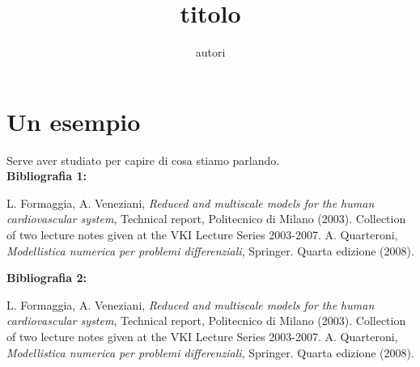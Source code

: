 \documentclass{article}
\title{titolo}
\author{autori}
\begin{document}
\maketitle

\tableofcontents

\section{Un esempio}

Serve aver studiato \cite[Cap. 2]{quarteroni} per capire di cosa stiamo parlando. \\
\textbf{Bibliografia 1:}
\begin{thebibliography}{9}
    L. Formaggia, A. Veneziani, \emph{Reduced and multiscale models for the human cardiovascular system},
    Technical report, Politecnico di Milano (2003).
    Collection of two lecture notes given at the VKI Lecture Series 2003-2007.
    A. Quarteroni, \emph{Modellistica numerica per problemi differenziali},
    Springer. Quarta edizione (2008).
\end{thebibliography}
\textbf{Bibliografia 2:}
\begin{thebibliography}{For.Ven. 2003}
    	L. Formaggia, A. Veneziani, \emph{Reduced and multiscale models for the human cardiovascular system},
        Technical report, Politecnico di Milano (2003).
        Collection of two lecture notes given at the VKI Lecture Series 2003-2007.
    	A. Quarteroni, \emph{Modellistica numerica per problemi differenziali},
        Springer. Quarta edizione (2008).
\end{thebibliography}
\end{document}
